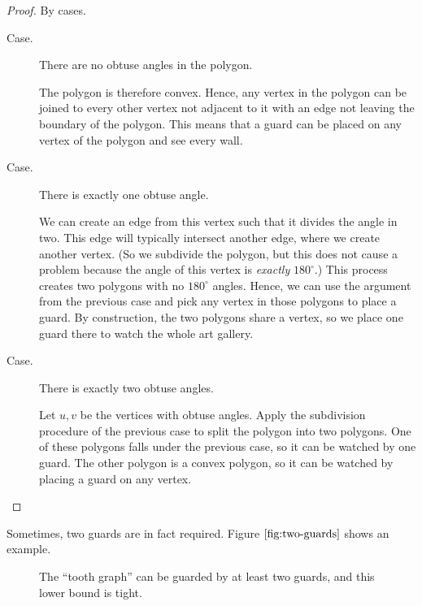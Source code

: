 \documentclass[12pt,letterpaper]{article}
\newcommand{\degrees}{^\circ}
\begin{document}
\begin{proof}
    By cases.

    \begin{description}
        \item[Case.] There are no obtuse angles in the polygon.

            The polygon is therefore convex. Hence, any vertex in the polygon
            can be joined to every other vertex not adjacent to it with an edge
            not leaving the boundary of the polygon. This means that a guard
            can be placed on any vertex of the polygon and see every wall.

        \item[Case.] There is exactly one obtuse angle.

            We can create an edge from this vertex such that it divides the
            angle in two. This edge will typically intersect another edge,
            where we create another vertex. (So we subdivide the polygon, but
            this does not cause a problem because the angle of this vertex is
            \emph{exactly} $180\degrees$.) This process creates two polygons
            with no $180\degrees$ angles. Hence, we can use the argument from
            the previous case and pick any vertex in those polygons to place a
            guard. By construction, the two polygons share a vertex, so we
            place one guard there to watch the whole art gallery.

        \item[Case.] There is exactly two obtuse angles.

            Let $u, v$ be the vertices with obtuse angles. Apply the
            subdivision procedure of the previous case to split the polygon
            into two polygons. One of these polygons falls under the previous
            case, so it can be watched by one guard. The other polygon is a
            convex polygon, so it can be watched by placing a guard on any
            vertex.
    \end{description}
\end{proof}

Sometimes, two guards are in fact required. Figure $\ref{fig:two-guards}$ shows
an example.

\begin{figure}[ht]
    \begin{center}
    \end{center}
    \caption{
        The ``tooth graph'' can be guarded by at least two guards, and this
        lower bound is tight.
    }
    \label{fig:two-guards}
\end{figure}
\end{document}
